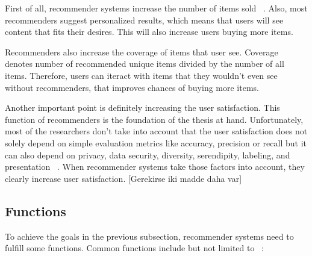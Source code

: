 First of all, recommender systems increase the number of items sold  ~\parencite{Ricci2015}.  Also, most recommenders suggest personalized results, which means that users will see content that fits their desires. This will also increase users buying more items.

Recommenders also increase the coverage of items that user see. Coverage denotes number of recommended unique items divided by the number of all items. Therefore, users can iteract with items that they wouldn't even see without recommenders, that improves chances of buying more items.

Another important point is definitely  increasing the user satisfaction. This function of recommenders is the foundation of the thesis at hand. Unfortunately, most of the researchers don't take into account that the user satisfaction does not solely depend on simple evaluation metrics like accuracy, precision or recall but it can also depend on privacy, data security, diversity, serendipity, labeling, and presentation ~\parencite{Beel2016}. When recommender systems take those factors into account, they clearly increase user satisfaction. [Gerekirse iki madde daha var]

\subsection{Functions}

To achieve the goals in the previous subsection, recommender systems need to fulfill some functions. Common functions include but not limited to ~\parencite{Ricci2015}:

